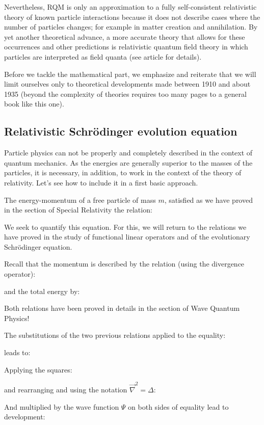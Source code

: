 	Nevertheless, RQM is only an approximation to a fully self-consistent relativistic theory of known particle interactions because it does not describe cases where the number of particles changes; for example in matter creation and annihilation. By yet another theoretical advance, a more accurate theory that allows for these occurrences and other predictions is relativistic quantum field theory in which particles are interpreted as field quanta (see article for details).
   	
   	Before we tackle the mathematical part, we emphasize and reiterate that we will limit ourselves only to theoretical developments made between 1910 and about 1935 (beyond the complexity of theories requires too many pages to a general book like this one).
   
   	
   	\pagebreak
	\subsection{Relativistic Schrödinger evolution equation}
	Particle physics can not be properly and completely described in the context of quantum mechanics. As the energies are generally superior to the masses of the particles, it is necessary, in addition, to work in the context of the theory of relativity. Let's see how to include it in a first basic approach.
	
	The energy-momentum of a free particle of mass $m$, satisfied as we have proved in the section of Special Relativity the relation:
	
	We seek to quantify this equation. For this, we will return to the relations we have proved in the study of functional linear operators and of the evolutionary Schrödinger equation.
	
	Recall that the momentum is described by the relation (using the divergence operator):
	
	and the total energy by:
	
	Both relations have been proved in details in the section of Wave Quantum Physics!
	
	The substitutions of the two previous relations applied to the equality:
	
	leads to:
	
	Applying the squares:
	
	and rearranging and using the notation $\vec{\nabla}^2= \Delta$:
	
	And multiplied by the wave function $\Psi$ on both sides of equality lead to development:
	
